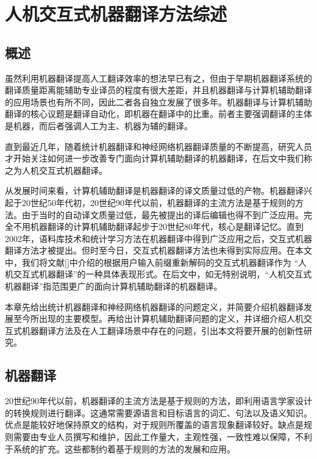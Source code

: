 
\chapter{人机交互式机器翻译方法综述}
\label{Chapter_overview}

\section{概述}

虽然利用机器翻译提高人工翻译效率的想法早已有之，但由于早期机器翻译系统的翻译质量距离能辅助专业译员的程度有很大差距，并且机器翻译与计算机辅助翻译的应用场景也有所不同，因此二者各自独立发展了很多年。机器翻译与计算机辅助翻译的核心议题是翻译自动化，即机器在翻译中的比重。前者主要强调翻译的主体是机器，而后者强调人工为主、机器为辅的翻译。

直到最近几年，随着统计机器翻译和神经网络机器翻译质量的不断提高，研究人员才开始关注如何进一步改善专门面向计算机辅助翻译的机器翻译，在后文中我们称之为人机交互式机器翻译。

从发展时间来看，计算机辅助翻译是机器翻译的译文质量过低的产物。机器翻译兴起于20世纪50年代初，20世纪90年代以前，机器翻译的主流方法是基于规则的方法。由于当时的自动译文质量过低，最先被提出的译后编辑也得不到广泛应用。完全不用机器翻译的计算机辅助翻译起步于20世纪80年代，核心是翻译记忆。直到2002年，语料库技术和统计学习方法在机器翻译中得到广泛应用之后，交互式机器翻译方法才被提出。但时至今日，交互式机器翻译方法也未得到实际应用。在本文中，我们将文献[\cite{Foster:2002,Koehn:2014}]中介绍的根据用户输入前缀重新解码的交互式机器翻译作为 “人机交互式机器翻译”的一种具体表现形式。在后文中，如无特别说明，“人机交互式机器翻译”指范围更广的面向计算机辅助翻译的机器翻译。

本章先给出统计机器翻译和神经网络机器翻译的问题定义，并简要介绍机器翻译发展至今所出现的主要模型。再给出计算机辅助翻译问题的定义，并详细介绍人机交互式机器翻译方法及在人工翻译场景中存在的问题，引出本文将要开展的创新性研究。


\section{机器翻译}

20世纪90年代以前，机器翻译的主流方法是基于规则的方法，即利用语言学家设计的转换规则进行翻译。这通常需要源语言和目标语言的词汇、句法以及语义知识。优点是能较好地保持原文的结构，对于规则所覆盖的语言现象翻译较好。缺点是规则需要由专业人员撰写和维护，因此工作量大，主观性强，一致性难以保障，不利于系统的扩充。这些都制约着基于规则的方法的发展和应用。

